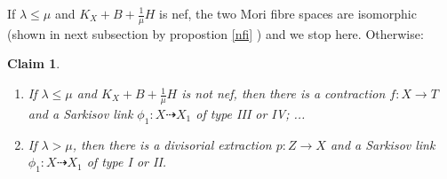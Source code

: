 \documentclass{article}
\newtheorem{claim}[defn]{Claim}
\begin{document}
If $ \lambda\leqslant\mu $ and $ K_X+B+\frac{1}{\mu}H $ is nef, the two Mori fibre spaces are isomorphic  (shown in next subsection by propostion \ref{nfi} ) and we stop here. Otherwise:
\begin{claim}
  \begin{enumerate}
  \item If $ \lambda\leqslant\mu $ and $ K_X+B+\frac{1}{\mu}H $ is not nef, then there is a contraction $f:X \to T$ and a Sarkisov link $\phi_{1}:X\dashrightarrow X_{1}$ of type III or IV;  ...
    \item  If $ \lambda>\mu $, then there is a divisorial extraction $p:Z\to X$ and a Sarkisov link $\phi_{1}:X\dashrightarrow X_{1}$ of type I or II.

\end{enumerate} 
\end{claim}
\end{document}

